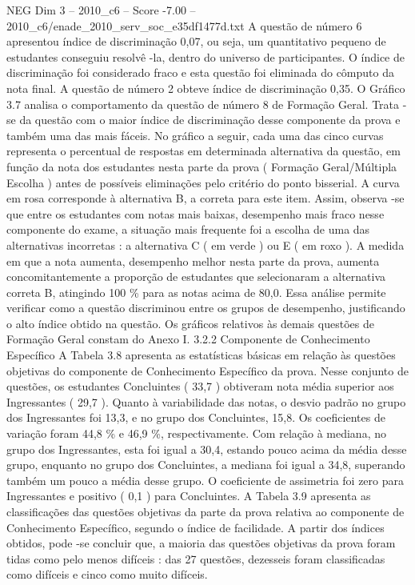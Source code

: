 \begin{textsample}{NEG Dim 3 – 2010\_c6 – Score -7.00 – 2010\_c6/enade\_2010\_serv\_soc\_e35df1477d.txt}
A questão de número 6 apresentou índice de discriminação 0,07, ou seja, um quantitativo pequeno de estudantes conseguiu resolvê -la, dentro do universo de participantes.
O índice de discriminação foi considerado fraco e esta questão foi eliminada do cômputo da nota final.
A questão de número 2 obteve índice de discriminação 0,35.
O Gráfico 3.7 analisa o comportamento da questão de número 8 de Formação Geral.
Trata -se da questão com o maior índice de discriminação desse componente da prova e também uma das mais fáceis.
No gráfico a seguir, cada uma das cinco curvas representa o percentual de respostas em determinada alternativa da questão, em função da nota dos estudantes nesta parte da prova ( Formação Geral/Múltipla Escolha ) antes de possíveis eliminações pelo critério do ponto bisserial.
A curva em rosa corresponde à alternativa B, a correta para este item.
Assim, observa -se que entre os estudantes com notas mais baixas, desempenho mais fraco nesse componente do exame, a situação mais frequente foi a escolha de uma das alternativas incorretas : a alternativa C ( em verde ) ou E ( em roxo ).
A medida em que a nota aumenta, desempenho melhor nesta parte da prova, aumenta concomitantemente a proporção de estudantes que selecionaram a alternativa correta B, atingindo 100 \% para as notas acima de 80,0.
Essa análise permite verificar como a questão discriminou entre os grupos de desempenho, justificando o alto índice obtido na questão.
Os gráficos relativos às demais questões de Formação Geral constam do Anexo I. 3.2.2 Componente de Conhecimento Específico A Tabela 3.8 apresenta as estatísticas básicas em relação às questões objetivas do componente de Conhecimento Específico da prova.
Nesse conjunto de questões, os estudantes Concluintes ( 33,7 ) obtiveram nota média superior aos Ingressantes ( 29,7 ).
Quanto à variabilidade das notas, o desvio padrão no grupo dos Ingressantes foi 13,3, e no grupo dos Concluintes, 15,8.
Os coeficientes de variação foram 44,8 \% e 46,9 \%, respectivamente.
Com relação à mediana, no grupo dos Ingressantes, esta foi igual a 30,4, estando pouco acima da média desse grupo, enquanto no grupo dos Concluintes, a mediana foi igual a 34,8, superando também um pouco a média desse grupo.
O coeficiente de assimetria foi zero para Ingressantes e positivo ( 0,1 ) para Concluintes.
A Tabela 3.9 apresenta as classificações das questões objetivas da parte da prova relativa ao componente de Conhecimento Específico, segundo o índice de facilidade.
A partir dos índices obtidos, pode -se concluir que, a maioria das questões objetivas da prova foram tidas como pelo menos difíceis : das 27 questões, dezesseis foram classificadas como difíceis e cinco como muito difíceis.

\end{textsample}

